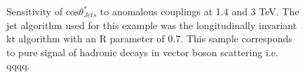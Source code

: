 \begin{figure}
\caption[Sensitivity of $\text{cos}\theta^{8}_{Jets}$ to the anomalous gauge couplings $\alpha_{4}$ and $\alpha_{5}$ at 1.4 and 3 TeV.]{Sensitivity of $\text{cos}\theta^{*}_{Jets}$ to anomalous couplings at 1.4 and 3 TeV. The jet algorithm used for this example was the longitudinally invariant kt algorithm with an R parameter of 0.7. This sample corresponds to pure signal of hadronic decays in vector boson scattering i.e. \nu{\nu}qqqq.}
\label{fig:costhetastarjets}
\end{figure}

